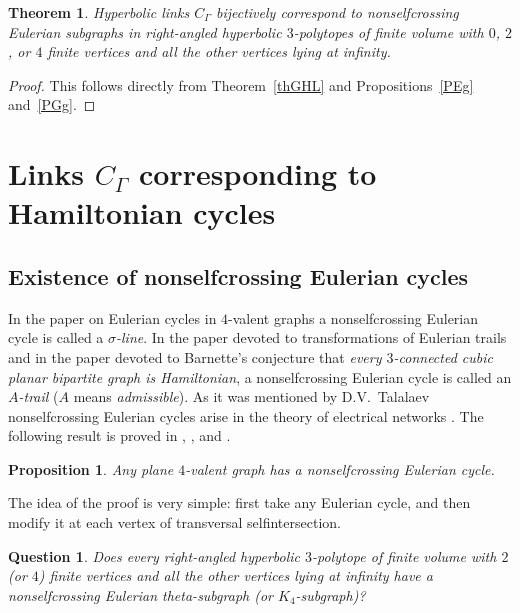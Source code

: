 \documentclass[12pt]{amsart}
\newtheorem{proposition}[formula]{Proposition}
\newtheorem{theorem}[formula]{Theorem}
\newtheorem{question}{Question}
\theoremstyle{definition}
\theoremstyle{remark}
\begin{document}
\begin{theorem}\label{thHLP}
Hyperbolic links $C_\Gamma$ bijectively correspond to nonselfcrossing 
Eulerian subgraphs in right-angled hyperbolic $3$-polytopes
of finite volume with $0$, $2$, or $4$ finite vertices and all the other vertices lying at infinity.
\end{theorem}
\begin{proof}
This follows directly from Theorem~\ref{thGHL} and Propositions~\ref{PEg} and~\ref{PGg}.
\end{proof}
\section{Links $C_\Gamma$ corresponding to Hamiltonian cycles}
\subsection{Existence of nonselfcrossing Eulerian cycles}
In the paper \cite{K68b} on Eulerian cycles in $4$-valent graphs a nonselfcrossing Eulerian cycle is called a {\it $\sigma$-line}.
In the paper \cite{FSW92} devoted to transformations of Eulerian trails and in the paper \cite{BFFS18} devoted to Barnette's conjecture that {\it every $3$-connected cubic planar bipartite graph is Hamiltonian},
a nonselfcrossing Eulerian cycle is called an {\it $A$-trail} ($A$ means {\it admissible}). 
As it was mentioned by D.V.~Talalaev nonselfcrossing Eulerian cycles arise in the theory of electrical 
networks \cite{BKT26}.
The following result is proved in \cite[Theorem 1]{K68a}, \cite[Theorem 10]{K68b}, and \cite[Theorem 1]{B83}. 
\begin{proposition}
Any plane $4$-valent graph has a nonselfcrossing Eulerian cycle.
\end{proposition}
The idea of the proof is very simple: first take any Eulerian cycle, and then modify it at each vertex of transversal selfintersection.
\begin{question}
Does every right-angled hyperbolic $3$-polytope
of finite volume with $2$ (or $4$) finite vertices and all the other vertices lying at infinity have 
a nonselfcrossing Eulerian theta-subgraph (or $K_4$-subgraph)?
\end{question}
\end{document}

